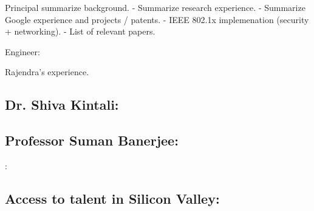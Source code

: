 
Principal 
summarize background.
- Summarize research experience.
- Summarize Google experience and projects / patents.
- IEEE 802.1x implemenation (security + networking).
- List of relevant papers.

Engineer:

Rajendra's experience.


\subsection{Dr. Shiva Kintali:}

\subsection{Professor Suman Banerjee:}
:
\subsection{Access to talent in Silicon Valley:}
